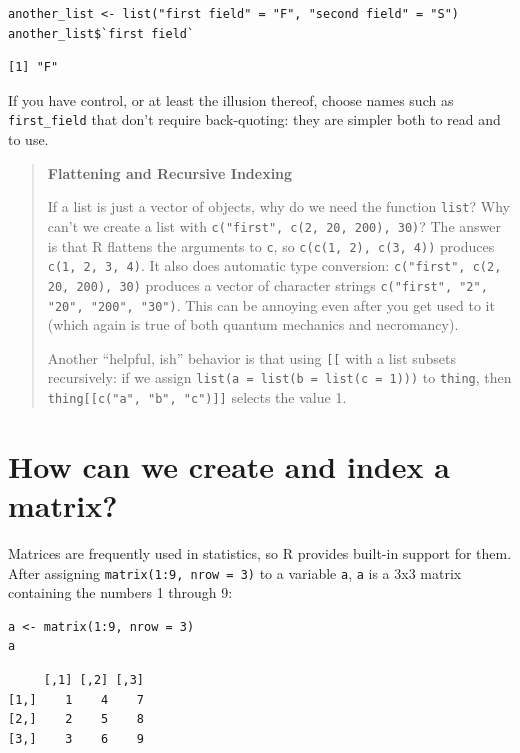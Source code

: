 \begin{lstlisting}
another_list <- list("first field" = "F", "second field" = "S")
another_list$`first field`
\end{lstlisting}

\begin{lstlisting}
[1] "F"
\end{lstlisting}

If you have control,
or at least the illusion thereof,
choose names such as \texttt{first\_field} that don't require back-quoting:
they are simpler both to read and to use.

\begin{quote}
\textbf{Flattening and Recursive Indexing}

If a list is just a vector of objects, why do we need the function \texttt{list}?
Why can't we create a list with \texttt{c("first", c(2, 20, 200), 30)}?
The answer is that R flattens the arguments to \texttt{c},
so \texttt{c(c(1, 2), c(3, 4))} produces \texttt{c(1, 2, 3, 4)}.
It also does automatic type conversion:
\texttt{c("first", c(2, 20, 200), 30)} produces a vector of character strings
\texttt{c("first", "2", "20", "200", "30")}.
This can be annoying even after you get used to it
(which again is true of both quantum mechanics and necromancy).

Another ``helpful, ish'' behavior is that using \texttt{[[} with a list subsets recursively:
if we assign \texttt{list(a = list(b = list(c = 1)))} to \texttt{thing},
then \texttt{thing[[c("a", "b", "c")]]} selects the value 1.
\end{quote}

\section{How can we create and index a matrix?}

Matrices are frequently used in statistics, so R provides built-in support for them.
After assigning \texttt{matrix(1:9, nrow = 3)} to a variable \texttt{a},
\texttt{a} is a 3x3 matrix containing the numbers 1 through 9:

\begin{lstlisting}
a <- matrix(1:9, nrow = 3)
a
\end{lstlisting}

\begin{lstlisting}
     [,1] [,2] [,3]
[1,]    1    4    7
[2,]    2    5    8
[3,]    3    6    9
\end{lstlisting}

